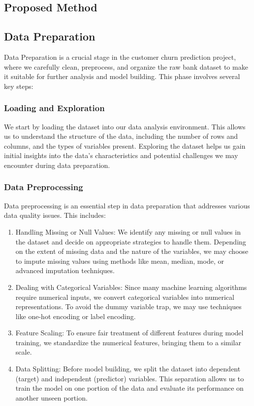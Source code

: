 \documentclass{article}
\begin{document}
\begin{multicols}{2}
\section{Proposed Method}

\subsection{Data Preparation}
Data Preparation is a crucial stage in the customer churn prediction project, where we carefully clean, preprocess, and organize the raw bank dataset to make it suitable for further analysis and model building. This phase involves several key steps: 

\subsubsection{Loading and Exploration}

We start by loading the dataset into our data analysis environment. This allows us to understand the structure of the data, including the number of rows and columns, and the types of variables present. Exploring the dataset helps us gain initial insights into the data's characteristics and potential challenges we may encounter during data preparation.

\subsubsection{Data Preprocessing}

Data preprocessing is an essential step in data preparation that addresses various data quality issues. This includes:

\begin{enumerate}
    \item Handling Missing or Null Values: We identify any missing or null values in the dataset and decide on appropriate strategies to handle them. Depending on the extent of missing data and the nature of the variables, we may choose to impute missing values using methods like mean, median, mode, or advanced imputation techniques.
    \item Dealing with Categorical Variables: Since many machine learning algorithms require numerical inputs, we convert categorical variables into numerical representations. To avoid the dummy variable trap, we may use techniques like one-hot encoding or label encoding.
    \item Feature Scaling: To ensure fair treatment of different features during model training, we standardize the numerical features, bringing them to a similar scale.
    \item Data Splitting: Before model building, we split the dataset into dependent (target) and independent (predictor) variables. This separation allows us to train the model on one portion of the data and evaluate its performance on another unseen portion.
\end{enumerate}


\end{multicols}
\end{document}
